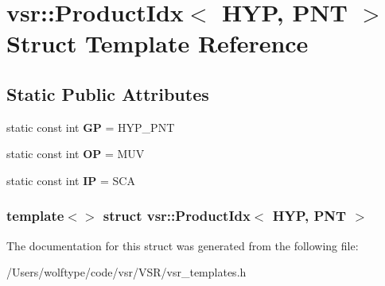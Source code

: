 \hypertarget{structvsr_1_1_product_idx_3_01_h_y_p_00_01_p_n_t_01_4}{\section{vsr\-:\-:Product\-Idx$<$ H\-Y\-P, P\-N\-T $>$ Struct Template Reference}
\label{structvsr_1_1_product_idx_3_01_h_y_p_00_01_p_n_t_01_4}
}
\subsection*{Static Public Attributes}
\begin{DoxyCompactItemize}
\item 
\hypertarget{structvsr_1_1_product_idx_3_01_h_y_p_00_01_p_n_t_01_4_ab0cd2bf0b64aaaa3474a766243cfd307}{static const int {\bfseries G\-P} = H\-Y\-P\-\_\-\-P\-N\-T}\label{structvsr_1_1_product_idx_3_01_h_y_p_00_01_p_n_t_01_4_ab0cd2bf0b64aaaa3474a766243cfd307}

\item 
\hypertarget{structvsr_1_1_product_idx_3_01_h_y_p_00_01_p_n_t_01_4_af41d3b10c79450b478fbdeba637a2977}{static const int {\bfseries O\-P} = M\-U\-V}\label{structvsr_1_1_product_idx_3_01_h_y_p_00_01_p_n_t_01_4_af41d3b10c79450b478fbdeba637a2977}

\item 
\hypertarget{structvsr_1_1_product_idx_3_01_h_y_p_00_01_p_n_t_01_4_a49c8a93a26a935c8f14777659eff925d}{static const int {\bfseries I\-P} = S\-C\-A}\label{structvsr_1_1_product_idx_3_01_h_y_p_00_01_p_n_t_01_4_a49c8a93a26a935c8f14777659eff925d}

\end{DoxyCompactItemize}
\subsubsection*{template$<$$>$ struct vsr\-::\-Product\-Idx$<$ H\-Y\-P, P\-N\-T $>$}



The documentation for this struct was generated from the following file\-:\begin{DoxyCompactItemize}
\item 
/\-Users/wolftype/code/vsr/\-V\-S\-R/vsr\-\_\-templates.\-h\end{DoxyCompactItemize}

